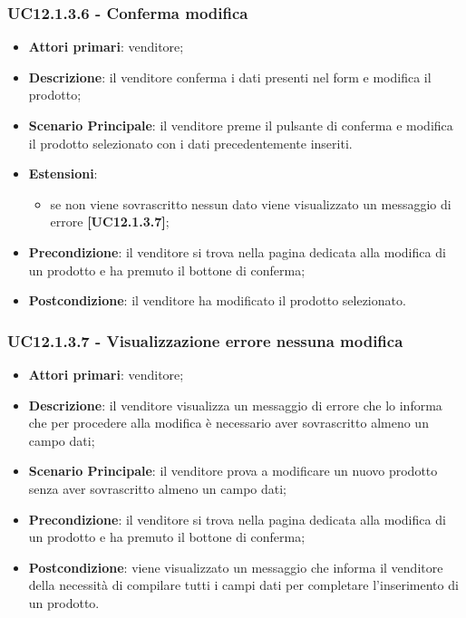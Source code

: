 \subsubsection{UC12.1.3.6 - Conferma modifica}
\begin{itemize}
\item \textbf{Attori primari}: venditore;
\item \textbf{Descrizione}: il venditore conferma i dati presenti nel form e modifica il prodotto;
\item \textbf{Scenario Principale}: il venditore preme il pulsante di conferma e modifica il prodotto selezionato con i dati precedentemente inseriti.
\item \textbf{Estensioni}: 
\begin{itemize}
	\item se non viene sovrascritto nessun dato viene visualizzato un messaggio di errore \textbf{[UC12.1.3.7]};
\end{itemize} 
\item \textbf{Precondizione}: il venditore si trova nella pagina dedicata alla modifica di un prodotto e ha premuto il bottone di conferma;
\item \textbf{Postcondizione}: il venditore ha modificato il prodotto selezionato.
\end{itemize}

\subsubsection{UC12.1.3.7 - Visualizzazione errore nessuna modifica}
\begin{itemize}
\item \textbf{Attori primari}: venditore;
\item \textbf{Descrizione}: il venditore visualizza un messaggio di errore che lo informa che per procedere alla modifica è necessario aver sovrascritto almeno un campo dati;
\item \textbf{Scenario Principale}: il venditore prova a modificare un nuovo prodotto senza aver sovrascritto almeno un campo dati;
\item \textbf{Precondizione}: il venditore si trova nella pagina dedicata alla modifica di un prodotto e ha premuto il bottone di conferma;
\item \textbf{Postcondizione}: viene visualizzato un messaggio che informa il venditore della necessità di compilare tutti i campi dati per completare l'inserimento di un prodotto.
\end{itemize}


